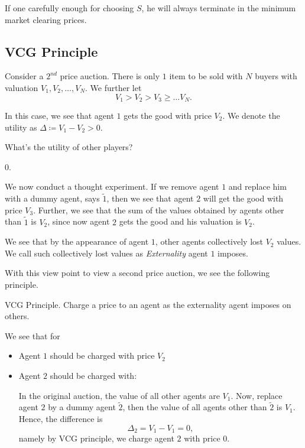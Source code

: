 If one carefully enough for choosing \(S\), he will always terminate in the minimum market clearing prices.

\subsection{VCG Principle}
Consider a \(2^{nd}\) price auction. There is only \(1\) item to be sold with \(N\) buyers with valuation \(V_{1}, V_{2}, \ldots , V_{N}\). We
further let
\[
	V_{1}>V_{2}>V_{3}\geq \ldots V_{N}.
\]

In this case, we see that agent \(1\) gets the good with price \(V_{2}\). We denote the utility as \(\Delta\coloneqq V_{1}-V_{2}>0\).

\begin{problem}
What's the utility of other players?
\begin{answer}
	\(0\).
\end{answer}
\end{problem}

\hr

We now conduct a thought experiment. If we remove agent \(1\) and replace him with a dummy agent, says \(\tilde{1}\), then we see that agent \(2\) will
get the good with price \(V_{3}\). Further, we see that the sum of the values obtained by agents other than \(\tilde{1}\) is \(V_{2}\), since now agent \(2\) gets
the good and his valuation is \(V_{2}\).

\hr

We see that by the appearance of agent \(1\), other agents collectively lost \(V_{2}\) values. We call such collectively lost values as \emph{Externality} agent \(1\) imposes.

With this view point to view a second price auction, we see the following principle.
\begin{theorem}
	VCG Principle. Charge a price to an agent as the externality agent imposes on others.
\end{theorem}
\begin{eg}
	We see that for
	\begin{itemize}
		\item Agent \(1\) should be charged with price \(V_2\)
		\item Agent \(2\) should be charged with:
		      \par In the original auction, the value of all other agents are \(V_{1}\). Now, replace agent \(2\) by a dummy agent \(\tilde{2}\), then the value of all agents other
		      than \(\tilde{2}\) is \(V_{1}\). Hence, the difference is
		      \[
			      \Delta_{2} = V_{1} - V_{1} = 0,
		      \]
		      namely by VCG principle, we charge agent \(2\) with price \(0\).
	\end{itemize}
\end{eg}

